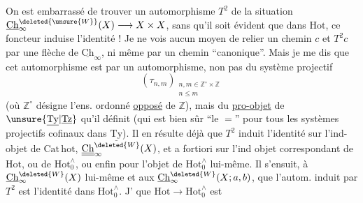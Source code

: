 On est embarrassé de trouver un automorphisme
$T^2$ de la situation $\underline{\mathrm{Ch}}^{\deleted{\unsure{W}}}_{\infty}(X)\longrightarrow X\times X$, sans qu'il
soit évident que dans $\mathrm{Hot}$, ce foncteur
induise l'identité ! Je ne vois aucun moyen
de relier un chemin $c$ et $T^2c$
par une flèche de $\underline{\mathrm{Ch}}_{\infty}$, ni même par
un chemin ``canonique''. Mais je me dis
que cet automorphisme est   par un automorphisme,
 non pas du système projectif
\[
(\tau_{n,m})_{\substack{n,m\in\mathbb Z^{\circ}\times\mathbb Z\\n\leq m}}
\]
(où  $\mathbb Z^{\circ}$ désigne l'ens. ordonné
\uline{opposé} de $\mathbb Z$), mais du \uline{pro-objet} de
$\unsure{\underline{\mathrm{Ty}}|\underline{\mathrm{Tz}}}$ qu'il définit (qui est bien sûr ``le $=$''
pour tous les systèmes projectifs cofinaux  dans
$\underline{\mathrm{Ty}}$). Il en résulte déjà que $T^2$
induit l'identité sur l'ind-objet
de $\mathrm{Cat}\,\mathrm{hot}$, $\underline{\underline{\mathrm{Ch}}}_{\infty}^{\deleted{W}}(X)$, et a fortiori sur
l'ind objet correspondant de $\mathrm{Hot}$, ou de
$\mathrm{Hot}_0^{\wedge}$, ou enfin pour l'objet de $\mathrm{Hot}_0^{\wedge}$ lui-même.
 Il s'ensuit,  à $\underline{\mathrm{Ch}}^{\deleted{W}}_{\infty}(X)$
lui-même et aux $\underline{\mathrm{Ch}}^{\deleted{W}}_{\infty}(X;a,b)$, que
l'autom. induit par $T^2$ est l'identité dans
$\mathrm{Hot}_0^{\wedge}$. J' que $\mathrm{Hot}\longrightarrow\mathrm{Hot}_0^{\wedge}$ est
